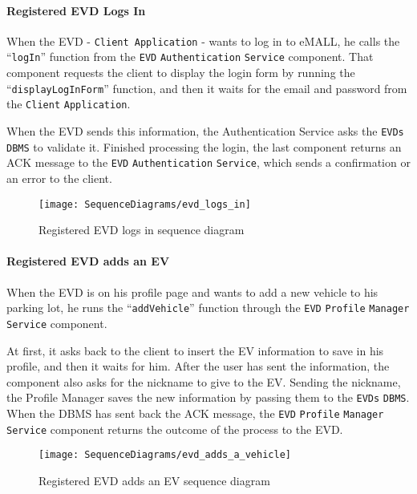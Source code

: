 \paragraph{Registered EVD Logs In}
When the EVD - \verb|Client Application| - wants to log in to eMALL, he calls the ``\verb|logIn|'' function from the \verb|EVD| \verb|Authentication| \verb|Service| component.
That component requests the client to display the login form by running the ``\verb|displayLogInForm|'' function, and then it waits for the email and password from the \verb|Client| \verb|Application|.

When the EVD sends this information, the Authentication Service asks the \verb|EVDs| \verb|DBMS| to validate it.
Finished processing the login, the last component returns an ACK message to the \verb|EVD| \verb|Authentication| \verb|Service|, which sends a confirmation or an error to the client.
\begin{figure}[H]
    \begin{center}
        \texttt{[image: SequenceDiagrams/evd\_logs\_in]}
        \caption{Registered EVD logs in sequence diagram}
        \label{fig:evd_logs_in}
    \end{center}
\end{figure}

\paragraph{Registered EVD adds an EV}
When the EVD is on his profile page and wants to add a new vehicle to his parking lot, he runs the ``\verb|addVehicle|'' function through the \verb|EVD| \verb|Profile| \verb|Manager| \verb|Service| component.

At first, it asks back to the client to insert the EV information to save in his profile, and then it waits for him.
After the user has sent the information, the component also asks for the nickname to give to the EV\@.
Sending the nickname, the Profile Manager saves the new information by passing them to the \verb|EVDs| \verb|DBMS|\@.
When the DBMS has sent back the ACK message, the \verb|EVD| \verb|Profile| \verb|Manager| \verb|Service| component returns the outcome of the process to the EVD\@.
\begin{figure}[H]
    \begin{center}
        \texttt{[image: SequenceDiagrams/evd\_adds\_a\_vehicle]}
        \caption{Registered EVD adds an EV sequence diagram}
        \label{fig:evd_adds_vehicle}
    \end{center}
\end{figure}

